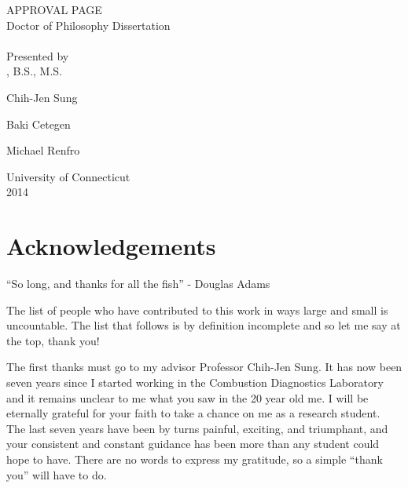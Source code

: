 \documentclass[12pt,letterpaper,oneside,final]{book}
\begin{document}
\setcounter{page}{1}
\begin{center}
APPROVAL PAGE \\
Doctor of Philosophy Dissertation \\
\thetitle \\
\blankline \blankline
Presented by \\
\theauthor, B.S., M.S. \\
\end{center}
\blankline
{}
\vspace{-0.5\baselineskip}
\begin{center}
Chih-Jen Sung
\end{center}
\blankline
{}
\vspace{-0.5\baselineskip}
\begin{center}
Baki Cetegen
\end{center}
\blankline
{}
\vspace{-0.5\baselineskip}
\begin{center}
Michael Renfro
\end{center}
\blankline \blankline \blankline \blankline \blankline
\begin{center}
University of Connecticut \\
2014
\end{center}
\newpage

{}
\chapter*{Acknowledgements}
``So long, and thanks for all the fish'' - Douglas Adams

The list of people who have contributed to this work in ways large and small
is uncountable. The list that follows is by definition incomplete
and so let me say at the top, thank you!

The first thanks must go to my advisor Professor Chih-Jen Sung. It has now been seven years since I started working in
the Combustion Diagnostics Laboratory and it remains unclear to me what you saw in the 20 year old me.
I will be eternally grateful for your faith to take a chance on me as a research student.
The last seven years have been by turns painful, exciting, and triumphant,
and your consistent and constant guidance has been more than any student could hope to
have. There are no words to express my gratitude, so a simple ``thank you''
will have to do.
\end{document}
